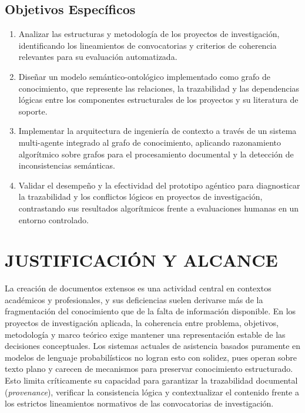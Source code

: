 \documentclass[12pt,letterpaper]{article}
\begin{document}
\subsection{Objetivos Específicos}
\begin{enumerate}[label=\textbf{\thesubsection.\arabic*}, leftmargin=*, labelsep=1em, itemsep=0.5em, topsep=0.5em]
    \item Analizar las estructuras y metodología de los proyectos de investigación, identificando los lineamientos de convocatorias y criterios de coherencia relevantes para su evaluación automatizada.
    
    \item Diseñar un modelo semántico-ontológico implementado como grafo de conocimiento, que represente las relaciones, la trazabilidad y las dependencias lógicas entre los componentes estructurales de los proyectos y su literatura de soporte.
    
    \item Implementar la arquitectura de ingeniería de contexto a través de un sistema multi-agente integrado al grafo de conocimiento, aplicando razonamiento algorítmico sobre grafos para el procesamiento documental y la detección de inconsistencias semánticas.
    
    \item Validar el desempeño y la efectividad del prototipo agéntico para diagnosticar la trazabilidad y los conflictos lógicos en proyectos de investigación, contrastando sus resultados algorítmicos frente a evaluaciones humanas en un entorno controlado.
\end{enumerate}


\newpage
\section{JUSTIFICACIÓN Y ALCANCE}
\vspace{-0.5cm}

La creación de documentos extensos es una actividad central en contextos académicos y profesionales, y sus deficiencias suelen derivarse más de la fragmentación del conocimiento que de la falta de información disponible. En los proyectos de investigación aplicada, la coherencia entre problema, objetivos, metodología y marco teórico exige mantener una representación estable de las decisiones conceptuales. Los sistemas actuales de asistencia basados puramente en modelos de lenguaje probabilísticos no logran esto con solidez, pues operan sobre texto plano y carecen de mecanismos para preservar conocimiento estructurado. Esto limita críticamente su capacidad para garantizar la trazabilidad documental (\textit{provenance}), verificar la consistencia lógica y contextualizar el contenido frente a los estrictos lineamientos normativos de las convocatorias de investigación.
\end{document}
